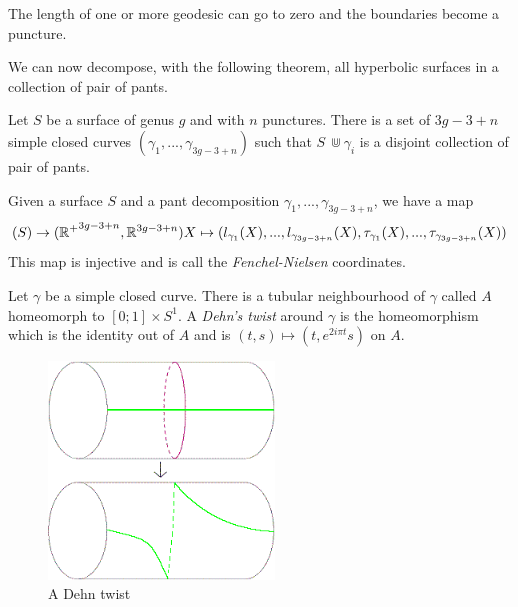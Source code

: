 \begin{rmq}
The length of one or more geodesic can go to zero and the boundaries become a puncture.
\end{rmq} %

We can now decompose, with the following theorem, all hyperbolic surfaces in a collection of pair of pants.

\begin{thm}
Let $S$ be a surface of genus $g$ and with $n$ punctures. There is a set of $3g-3+n$ simple closed curves $(\gamma_1,...,\gamma_{3g-3+n})$ such that $S\ \Cup \gamma_i$ is a disjoint collection of pair of pants.
\end{thm} %

\begin{dfnt}
Given a surface $S$ and a pant decomposition $\gamma_1,...,\gamma_{3g-3+n}$, we have a map \[
\mathcal(S) \rightarrow (\mathbb{R^{+}}^{3g-3+n},\mathbb{R}^{3g-3+n}) \\
X \mapsto (l_{\gamma_1}(X),...,l_{\gamma_{3g-3+n}}(X),\tau_{\gamma_1}(X),...,\tau_{\gamma_{3g-3+n}}(X))
\]
This map is injective and is call the \emph{Fenchel-Nielsen} coordinates.
\end{dfnt}

\begin{dfnt}
Let $\gamma$ be a simple closed curve. There is a tubular neighbourhood of $\gamma$ called $A$ homeomorph to $[0;1] \times S^{1}$.
A \emph{Dehn's twist} around $\gamma$ is the homeomorphism which is the identity out of $A$ and is $(t,s) \mapsto (t,e^{2i \pi t} s)$ on $A$.
\end{dfnt}

\begin{figure}[!h]
\centering
\includegraphics[width=6cm]{Image/Dehn_twist.png}
\caption{A Dehn twist}
\end{figure}

